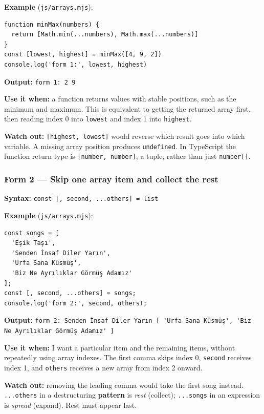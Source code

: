 \documentclass[
  9pt,
]{article}
\newcommand{\passthrough}[1]{#1}
\begin{document}
\textbf{Example} (\passthrough{\lstinline!js/arrays.mjs!}):

\begin{lstlisting}
function minMax(numbers) {
  return [Math.min(...numbers), Math.max(...numbers)]
}
const [lowest, highest] = minMax([4, 9, 2])
console.log('form 1:', lowest, highest)
\end{lstlisting}

\textbf{Output:} \passthrough{\lstinline!form 1: 2 9!}

\textbf{Use it when:} a function returns values with stable positions,
such as the minimum and maximum. This is equivalent to getting the
returned array first, then reading index 0 into
\passthrough{\lstinline!lowest!} and index 1 into
\passthrough{\lstinline!highest!}.

\textbf{Watch out:} \passthrough{\lstinline![highest, lowest]!} would
reverse which result goes into which variable. A missing array position
produces \passthrough{\lstinline!undefined!}. In TypeScript the function
return type is \passthrough{\lstinline![number, number]!}, a tuple,
rather than just \passthrough{\lstinline!number[]!}.

\subsubsection{Form 2 --- Skip one array item and collect the
rest}\label{form-2-skip-one-array-item-and-collect-the-rest}

\textbf{Syntax:}
\passthrough{\lstinline!const [, second, ...others] = list!}

\textbf{Example} (\passthrough{\lstinline!js/arrays.mjs!}):

\begin{lstlisting}
const songs = [
  'Eşik Taşı',
  'Senden İnsaf Diler Yarın',
  'Urfa Sana Küsmüş',
  'Biz Ne Ayrılıklar Görmüş Adamız'
];
const [, second, ...others] = songs;
console.log('form 2:', second, others);
\end{lstlisting}

\textbf{Output:}
\passthrough{\lstinline!form 2: Senden İnsaf Diler Yarın [ 'Urfa Sana Küsmüş', 'Biz Ne Ayrılıklar Görmüş Adamız' ]!}

\textbf{Use it when:} I want a particular item and the remaining items,
without repeatedly using array indexes. The first comma skips index 0,
\passthrough{\lstinline!second!} receives index 1, and
\passthrough{\lstinline!others!} receives a new array from index 2
onward.

\textbf{Watch out:} removing the leading comma would take the first song
instead. \passthrough{\lstinline!...others!} in a destructuring
\textbf{pattern} is \emph{rest} (collect);
\passthrough{\lstinline!...songs!} in an expression is \emph{spread}
(expand). Rest must appear last.
\end{document}
